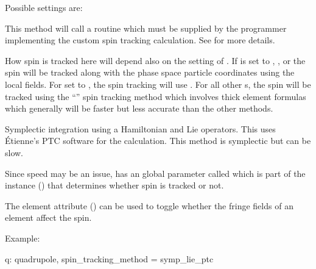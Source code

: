 Possible  settings are:
\begin{description}

\item[\vn{Custom}] \Newline
This method will call a routine  which must be supplied by the
programmer implementing the custom spin tracking calculation. See  for
more details.

\item[\vn{Tracking}] \Newline
How spin is tracked here will depend also on the setting of . If
 is set to , , or  the
spin will be tracked along with the phase space particle coordinates using the local
fields. For  set to , the spin tracking will use
.  For all other s, the spin will be tracked using the
``'' spin tracking method which involves thick element formulas which generally
will be faster but less accurate than the other methods.

\item[\vn{Symp_Lie_PTC}] \Newline
Symplectic integration using a Hamiltonian and Lie operators.  This uses \'Etienne's PTC
software for the calculation.  This method is symplectic but can be slow.

\end{description}

Since speed may be an issue, \bmad has an global parameter called
 which is part of the  instance
() that determines whether spin is tracked or not.

The  element attribute () can be used to toggle
whether the fringe fields of an element affect the spin.

Example:
\begin{example}
  q: quadrupole, spin_tracking_method = symp_lie_ptc
\end{example}


